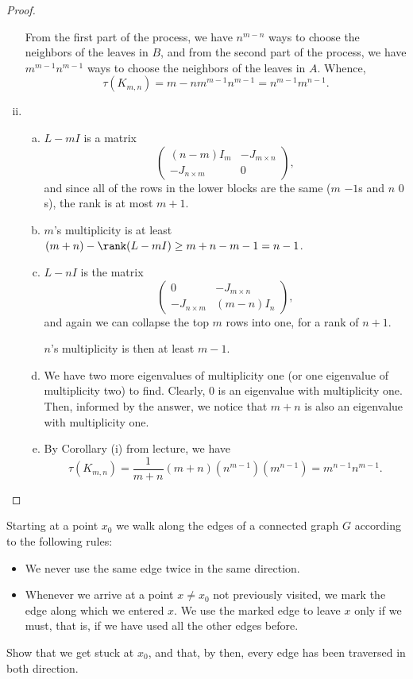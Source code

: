 \documentclass[11pt]{article}
\begin{document}
\begin{proof}
\begin{enumerate}[(i)]
        From the first part of the process, we have $n^{m-n}$ ways to choose the neighbors of the leaves in $B$, and from the second part of the process, we have $m^{m-1} n^{m-1}$ ways to choose the neighbors of the leaves in $A$. Whence,
        \[
            \tau(K_{m,n})={m-n}m^{m-1} n^{m-1}=n^{m-1}m^{n-1}.
        \]

        \item \begin{enumerate}[(a)]
            \item $L-mI$ is a matrix \[\begin{pmatrix}(n-m)I_m&-J_{m\times n}\\-J_{n\times m}&0\end{pmatrix},\] and since all of the rows in the lower blocks are the same ($m$ $-1$s and $n$ $0$s), the rank is at most $m+1$.
            \item $m$'s multiplicity is at least $(m+n)-\rank(L-mI)\geq m+n-m-1=n-1$.
            \item $L-nI$ is the matrix \[\begin{pmatrix}0&-J_{m\times n}\\-J_{n\times m}& (m-n)I_n\end{pmatrix},\] and again we can collapse the top $m$ rows into one, for a rank of $n+1$.
            
            $n$'s multiplicity is then at least $m-1$.
            \item We have two more eigenvalues of multiplicity one (or one eigenvalue of multiplicity two) to find. Clearly, $0$ is an eigenvalue with multiplicity one. Then, informed by the answer, we notice that $m+n$ is also an eigenvalue with multiplicity one.
            \item By Corollary (i) from lecture, we have \[\tau(K_{m,n})=\frac{1}{m+n}(m+n)(n^{m-1})(m^{n-1})=m^{n-1}n^{m-1}.\]
        \end{enumerate}
    \end{enumerate}
\end{proof}
\setcounter{problem}{3}
\begin{quest}
    Starting at a point $x_0$ we walk along the edges of a connected graph $G$ according to the following rules:
    \begin{itemize}
        \item We never use the same edge twice in the same direction.
        \item Whenever we arrive at a point $x\neq x_0$ not previously visited, we mark the edge along which we entered $x$. We use the marked edge to leave $x$ only if we must, that is, if we have used all the other edges before.
    \end{itemize}
    Show that we get stuck at $x_0$, and that, by then, every edge has been traversed in both direction.
\end{quest}
\end{document}
